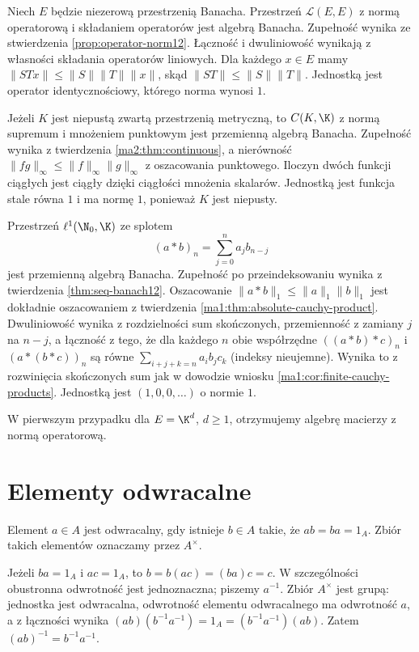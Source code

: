 \begin{przyklad}
\label{ex:banach-algebras31}
Niech $E$ będzie niezerową przestrzenią Banacha.
Przestrzeń $\mathcal L(E,E)$ z normą operatorową
i składaniem operatorów jest algebrą Banacha.
Zupełność wynika ze stwierdzenia
\ref{prop:operator-norm12}. Łączność i dwuliniowość
wynikają z własności składania operatorów liniowych.
Dla każdego $x\in E$ mamy
$\|STx\|\le\|S\|\|T\|\|x\|$, skąd
$\|ST\|\le\|S\|\|T\|$. Jednostką jest operator
identycznościowy, którego norma wynosi $1$.

Jeżeli $K$ jest niepustą zwartą przestrzenią metryczną,
to $C(K,\K)$ z normą supremum i mnożeniem punktowym
jest przemienną algebrą Banacha. Zupełność wynika
z twierdzenia \ref{ma2:thm:continuous}, a nierówność
$\|fg\|_\infty\le\|f\|_\infty\|g\|_\infty$ z oszacowania
punktowego. Iloczyn dwóch funkcji ciągłych jest
ciągły dzięki ciągłości mnożenia skalarów.
Jednostką jest funkcja stale równa $1$ i ma normę $1$,
ponieważ $K$ jest niepusty.

Przestrzeń $\ell^1(\N_0,\K)$ ze splotem
\[
 (a*b)_n=\sum_{j=0}^n a_jb_{n-j}
\]
jest przemienną algebrą Banacha. Zupełność po
przeindeksowaniu wynika z twierdzenia
\ref{thm:seq-banach12}. Oszacowanie
$\|a*b\|_1\le\|a\|_1\|b\|_1$
jest dokładnie oszacowaniem z twierdzenia
\ref{ma1:thm:absolute-cauchy-product}.
Dwuliniowość wynika z rozdzielności sum skończonych,
przemienność z zamiany $j$ na $n-j$, a łączność z tego,
że dla każdego $n$ obie współrzędne
$((a*b)*c)_n$ i $(a*(b*c))_n$ są równe
$\sum_{i+j+k=n}a_i b_j c_k$ (indeksy nieujemne).
Wynika to z rozwinięcia skończonych sum
jak w dowodzie wniosku \ref{ma1:cor:finite-cauchy-products}.
Jednostką jest $(1,0,0,\ldots)$ o normie $1$.
\end{przyklad}
W pierwszym przypadku dla $E=\K^d$, $d\ge1$,
otrzymujemy algebrę macierzy z normą operatorową.

\section{Elementy odwracalne}

\begin{definicja}
\label{ma2:def:algebra-invertible}
Element $a\in A$ jest odwracalny, gdy istnieje $b\in A$
takie, że $ab=ba=1_A$. Zbiór takich elementów
oznaczamy przez $A^\times$.
\end{definicja}
Jeżeli $ba=1_A$ i $ac=1_A$, to
$b=b(ac)=(ba)c=c$. W szczególności obustronna
odwrotność jest jednoznaczna; piszemy $a^{-1}$.
Zbiór $A^\times$ jest grupą: jednostka jest odwracalna,
odwrotność elementu odwracalnego ma odwrotność $a$,
a z łączności wynika
$(ab)(b^{-1}a^{-1})=1_A=(b^{-1}a^{-1})(ab)$.
Zatem $(ab)^{-1}=b^{-1}a^{-1}$.

